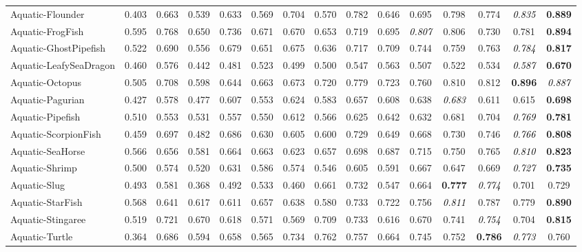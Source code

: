 \documentclass[10pt,journal,compsoc]{IEEEtran}
\newcommand{\Rev}[1]{\textcolor{black}{#1}}
\begin{document}
\begin{table*}[thp!]
\begin{tabular}{l | ccccc ccccc cccc}
Aquatic-Flounder &0.403 &0.663 &0.539 &0.633 &0.569 &0.704 &0.570 &0.782 &0.646 &0.695 &0.798 &0.774 & \Rev{\textit{0.835}} &\textbf{0.889}\\
\rowcolor{mygray}
Aquatic-FrogFish &0.595 &0.768 &0.650 &0.736 &0.671 &0.670 &0.653 &0.719 &0.695 & \Rev{\textit{0.807}} &0.806 &0.730 &0.781 &\textbf{0.894}\\
Aquatic-GhostPipefish &0.522 &0.690 &0.556 &0.679 &0.651 &0.675 &0.636 &0.717 &0.709 &0.744 &0.759 &0.763 & \Rev{\textit{0.784}} &\textbf{0.817}\\
\rowcolor{mygray}
Aquatic-LeafySeaDragon &0.460 &0.576 &0.442 &0.481 &0.523 &0.499 &0.500 &0.547 &0.563 &0.507 &0.522 &0.534 & \Rev{\textit{0.587}} &\textbf{0.670}\\
Aquatic-Octopus &0.505 &0.708 &0.598 &0.644 &0.663 &0.673 &0.720 &0.779 &0.723 &0.760 &0.810 &0.812 &\textbf{0.896} & \Rev{\textit{0.887}}\\
\rowcolor{mygray}
Aquatic-Pagurian &0.427 &0.578 &0.477 &0.607 &0.553 &0.624 &0.583 &0.657 &0.608 &0.638 & \Rev{\textit{0.683}} &0.611 &0.615 &\textbf{0.698}\\
Aquatic-Pipefish &0.510 &0.553 &0.531 &0.557 &0.550 &0.612 &0.566 &0.625 &0.642 &0.632 &0.681 &0.704 & \Rev{\textit{0.769}} &\textbf{0.781}\\
\rowcolor{mygray}
Aquatic-ScorpionFish &0.459 &0.697 &0.482 &0.686 &0.630 &0.605 &0.600 &0.729 &0.649 &0.668 &0.730 &0.746 & \Rev{\textit{0.766}} &\textbf{0.808}\\
Aquatic-SeaHorse &0.566 &0.656 &0.581 &0.664 &0.663 &0.623 &0.657 &0.698 &0.687 &0.715 &0.750 &0.765 & \Rev{\textit{0.810}} &\textbf{0.823}\\
\rowcolor{mygray}
Aquatic-Shrimp &0.500 &0.574 &0.520 &0.631 &0.586 &0.574 &0.546 &0.605 &0.591 &0.667 &0.647 &0.669 & \Rev{\textit{0.727}} &\textbf{0.735}\\
Aquatic-Slug &0.493 &0.581 &0.368 &0.492 &0.533 &0.460 &0.661 &0.732 &0.547 &0.664 &\textbf{0.777} & \Rev{\textit{0.774}} &0.701 &0.729\\
\rowcolor{mygray}
Aquatic-StarFish &0.568 &0.641 &0.617 &0.611 &0.657 &0.638 &0.580 &0.733 &0.722 &0.756 & \Rev{\textit{0.811}} &0.787 &0.779 &\textbf{0.890}\\
Aquatic-Stingaree &0.519 &0.721 &0.670 &0.618 &0.571 &0.569 &0.709 &0.733 &0.616 &0.670 &0.741 & \Rev{\textit{0.754}} &0.704 &\textbf{0.815}\\
\rowcolor{mygray}
Aquatic-Turtle &0.364 &0.686 &0.594 &0.658 &0.565 &0.734 &0.762 &0.757 &0.664 &0.745 &0.752 &\textbf{0.786} & \Rev{\textit{0.773}} &0.760\\

\end{tabular}
\end{table*}
\end{document}

